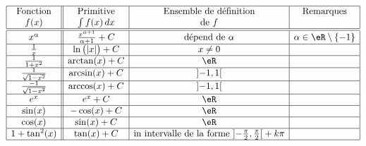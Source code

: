 \label{PageLCHooMbWjOj}
\begin{equation*}
	\begin{array}[]{|c||c|c|c|}
		\hline
		\text{Fonction}           & \text{Primitive}                      & \text{Ensemble de définition}                                                                   & \text{Remarques}               \\
		f(x)                      & \int f(x)\, dx                        & \text{de } f                                                                                    &                                \\
		\hline\hline
		x^{\alpha}                & \frac{ x^{\alpha+1} }{ \alpha+1 } + C & \text{dépend de }\alpha                                                                         & \alpha\in \eR\setminus\{ -1 \} \\
		\hline
		\frac{1}{ x }             & \ln\big( | x | \big) + C              & x\neq 0                                                                                         &                                \\
		\hline
		\frac{1}{ 1+x^2 }         & \arctan(x) + C                        & \eR                                                                                             &                                \\
		\hline
		\frac{1}{ \sqrt{1-x^2} }  & \arcsin(x) + C                        & \mathopen] -1 , 1 \mathclose[                                                                   &                                \\
			\hline
		\frac{-1}{ \sqrt{1-x^2} } & \arccos(x) + C                        & \mathopen] -1 , 1 \mathclose[                                                                   &                                \\
			\hline
		e^x                       & e^x + C                               & \eR                                                                                             &                                \\
			\hline
		\sin(x)                   & -\cos(x) + C                          & \eR                                                                                             &                                \\
			\hline
		\cos(x)                   & \sin(x) + C                           & \eR                                                                                             &                                \\
			\hline
		1+\tan^2(x)               & \tan(x) + C                           & \text{in intervalle de la forme }\mathopen] -\frac{ \pi }{2} , \frac{ \pi }{2} \mathclose[+k\pi &                                \\
		\hline
	\end{array}
\end{equation*}



